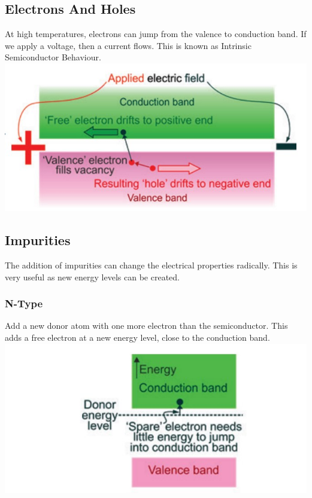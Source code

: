 \documentclass[a4paper,11pt, twocolumn]{article}
\begin{document}
\subsection{Electrons And Holes}
At high temperatures, electrons can jump from the valence to conduction band. If we apply a voltage, then a current flows. This is known as Intrinsic Semiconductor Behaviour.
\includegraphics[width=\linewidth]{electronsAndHoles.jpg}
\subsection{Impurities}
The addition of impurities can change the electrical properties radically. This is very useful as new energy levels can be created.
\subsubsection{N-Type}
Add a new donor atom with one more electron than the semiconductor. This adds a free electron at a new energy level, close to the conduction band. 
\includegraphics[width=\linewidth]{impureN.jpg}
\end{document}
